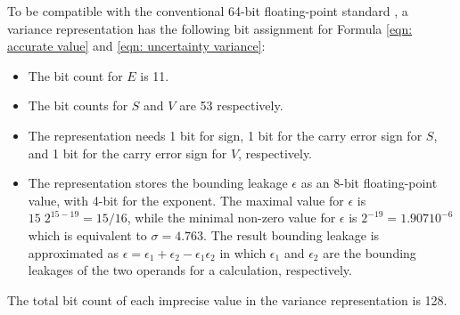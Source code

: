 \documentclass[twoside]{article}
\numberwithin{equation}{section}
\begin{document}
To be compatible with the conventional 64-bit floating-point standard \cite{Floating_Point_Standard}, a variance representation has the following bit assignment for Formula \eqref{eqn: accurate value} and \eqref{eqn: uncertainty variance}:
\begin{itemize}
\item The bit count for $E$ is 11.

\item The bit counts for $S$ and $V$ are 53 respectively.

\item The representation needs 1 bit for sign, 1 bit for the carry error sign for $S$, and 1 bit for the carry error sign for $V$, respectively.

\item The representation stores the bounding leakage $\epsilon$ as an 8-bit floating-point value, with 4-bit for the exponent.
The maximal value for $\epsilon$ is $15\;2^{15-19} = 15/16$, while the minimal non-zero value for $\epsilon$ is $2^{-19} = 1.907 10^{-6}$ which is equivalent to $\sigma=4.763$.
The result bounding leakage is approximated as $\epsilon = \epsilon_1 + \epsilon_2 - \epsilon_1 \epsilon_2$ in which $\epsilon_1$ and $\epsilon_2$ are the bounding leakages of the two operands for a calculation, respectively.
\end{itemize}
The total bit count of each imprecise value in the variance representation is 128.
\end{document}
